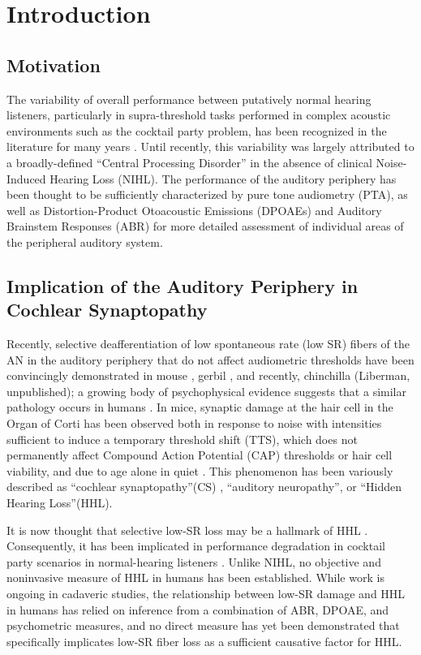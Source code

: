 \chapter{Introduction}
\label{chapter:Introduction}
\thispagestyle{myheadings}
\section{Motivation}
The variability of overall performance between putatively normal hearing listeners, particularly in supra-threshold tasks performed in complex acoustic environments such as the cocktail party problem, has been recognized in the literature for many years \citep{Cherry1953Some}.  Until recently, this variability was largely attributed to a broadly-defined ``Central Processing Disorder'' in the absence of clinical Noise-Induced Hearing Loss (NIHL). The performance of the auditory periphery has been thought to be sufficiently characterized by pure tone audiometry (PTA), as well as Distortion-Product Otoacoustic Emissions (DPOAEs) and Auditory Brainstem Responses (ABR) for more detailed assessment of individual areas of the peripheral auditory system.

\section{Implication of the Auditory Periphery in Cochlear Synaptopathy}
Recently, selective deafferentiation of low spontaneous rate (low SR) fibers of the AN in the auditory periphery that do not affect audiometric thresholds have been convincingly demonstrated in mouse \citep{Kujawa2009Adding}, gerbil \citep{Furman2013NoiseInduced}, and recently, chinchilla (Liberman, unpublished); a growing body of psychophysical evidence suggests that a similar pathology occurs in humans \citep{Bharadwaj2015Individual}.  In mice, synaptic damage at the hair cell in the Organ of Corti has been observed both in response to noise with intensities sufficient to induce a temporary threshold shift (TTS), which does not permanently affect Compound Action Potential (CAP) thresholds or hair cell viability, and due to age alone in quiet \citep{Sergeyenko2013AgeRelated,Fernandez2015Aging}. This phenomenon has been variously described as ``cochlear synaptopathy''(CS) \citep{Bharadwaj2014Cochlear}, ``auditory neuropathy'', or ``Hidden Hearing Loss''(HHL).  

It is now thought that selective low-SR loss may be a hallmark of HHL \citep{Furman2013NoiseInduced,Bharadwaj2014Cochlear,Bharadwaj2015Individual,Schaette2011Tinnitus}. Consequently, it has been implicated in performance degradation in cocktail party scenarios in normal-hearing listeners \citep{Bharadwaj2015Individual,Bharadwaj2014Cochlear}.  Unlike NIHL, no objective and noninvasive measure of HHL in humans has been established.  While work is ongoing in cadaveric studies, the relationship between low-SR damage and HHL in humans has relied on inference from a combination of ABR, DPOAE, and psychometric measures, and no direct measure has yet been demonstrated that specifically implicates low-SR fiber loss as a sufficient causative factor for HHL.

